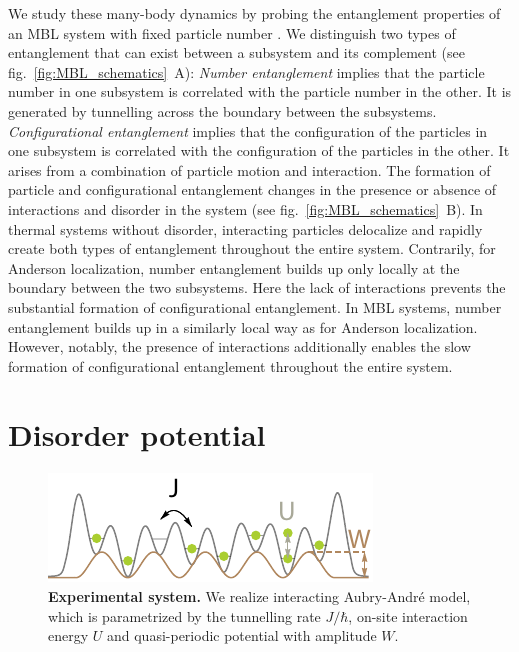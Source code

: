 We study these many-body dynamics by probing the entanglement properties of an MBL system with fixed particle number \cite{ Znidaric2008, Bardarson2012, Serbyn2013, Serbyn2013b, Huse2014}. We distinguish two types of entanglement that can exist between a subsystem and its complement (see fig.~\ref{fig:MBL_schematics}~A): \textit{Number entanglement} implies that the particle number in one subsystem is correlated with the particle number in the other. It is generated by tunnelling across the boundary between the subsystems. \textit{Configurational entanglement} implies that the configuration of the particles in one subsystem is correlated with the configuration of the particles in the other. It arises from a combination of particle motion and interaction. The formation of particle and configurational entanglement changes in the presence or absence of interactions and disorder in the system (see fig.~\ref{fig:MBL_schematics}~B). In thermal systems without disorder, interacting particles delocalize and rapidly create both types of entanglement throughout the entire system. Contrarily, for Anderson localization, number entanglement builds up only locally at the boundary between the two subsystems. Here the lack of interactions prevents the substantial formation of configurational entanglement. In MBL systems, number entanglement builds up in a similarly local way as for Anderson localization. However, notably, the presence of interactions additionally enables the slow formation of configurational entanglement throughout the entire system. 

\section{Disorder potential}

\begin{figure}[t]
	\centering
	\includegraphics{figures/MBL_setup.pdf}
	\caption{\label{fig:MBL_model} \textbf{Experimental system.} We realize interacting Aubry-Andr\'e model, which is parametrized by the tunnelling rate $J/\hbar$, on-site interaction energy $U$ and quasi-periodic potential with amplitude $W$.}
\end{figure}

